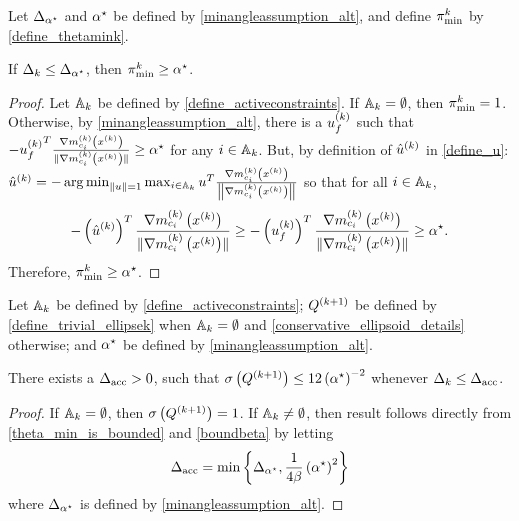 \begin{lemma}
\label{theta_min_is_bounded}
Let ${\Delta_{\alpha^{\star}}}$ and ${ \alpha^{\star} }$ be defined by \cref{minangleassumption_alt}, and
define ${\pi^k_{\textrm{min}}}$ by \cref{define_thetamink}.



If $\Delta_k \le {\Delta_{\alpha^{\star}}}$, then ${\pi^k_{\textrm{min}}} \ge { \alpha^{\star} }$.
\end{lemma}

\begin{proof}
Let ${\mathbb A_{k}}$ be defined by \cref{define_activeconstraints}.
If ${\mathbb A_{k}} = \emptyset$, then ${\pi^k_{\textrm{min}}} = 1$.
Otherwise, by \cref{minangleassumption_alt}, there is a ${u^{(k)}_f}$ such that 
$-{u^{(k)}_f}^T\frac{{\nabla m_{c_i}^{(k)}\left(x^{(k)}\right)}}{\|{\nabla m_{c_i}^{(k)}\left(x^{(k)}\right)}\|} \ge { \alpha^{\star} }$ for any $i \in {\mathbb A_{k}}$.
But, by definition of ${{\hat u}^{(k)}}$ in \cref{define_u}:
${{\hat u}^{(k)}} = -\operatorname*{arg\,min}_{\|u\| = 1} \max_{i \in {\mathbb A_{k}}} u^T\frac{{\nabla m_{c_i}^{(k)}\left(x^{(k)}\right)}}{\left\|{\nabla m_{c_i}^{(k)}\left(x^{(k)}\right)}\right\|}$
so that for all $i \in {\mathbb A_{k}}$,
\begin{align*}
-\left({{\hat u}^{(k)}}\right)^T\frac{{\nabla m_{c_i}^{(k)}\left(x^{(k)}\right)}}{\|{\nabla m_{c_i}^{(k)}\left(x^{(k)}\right)}\|}  \ge -\left({u^{(k)}_f}\right)^T\frac{{\nabla m_{c_i}^{(k)}\left(x^{(k)}\right)}}{\|{\nabla m_{c_i}^{(k)}\left(x^{(k)}\right)}\|} \ge { \alpha^{\star} }.
\end{align*}
Therefore, ${\pi^k_{\textrm{min}}} \ge { \alpha^{\star} }$.
\end{proof}

\begin{lemma}
\label{bounded_condition_numbers}
Let ${\mathbb A_{k}}$ be defined by \cref{define_activeconstraints};
${Q^{(k+1)}}$ be defined by \cref{define_trivial_ellipsek} when ${\mathbb A_{k}} = \emptyset$ and \cref{conservative_ellipsoid_details} otherwise;
and ${ \alpha^{\star} }$ be defined by \cref{minangleassumption_alt}.



There exists a ${\Delta_{\textrm{acc}}} > 0$, such that ${\sigma}\left({Q^{(k+1)}}\right) \le {12}\left({ \alpha^{\star} }\right)^{-2}$ whenever $\Delta_k \le {\Delta_{\textrm{acc}}}$.
\end{lemma}
\begin{proof}
If ${\mathbb A_{k}} = \emptyset$, then 
${\sigma} \left({Q^{(k+1)}}\right) = 1$.
If ${\mathbb A_{k}} \ne \emptyset$, then result follows directly from \cref{theta_min_is_bounded} and \cref{boundbeta} by letting
\begin{align}
{\Delta_{\textrm{acc}}} = \min\left\{{\Delta_{\alpha^{\star}}}, \frac 1 {4 \beta} \left({ \alpha^{\star} } \right)^2 \right\} \label{define_delta_accuracy}
\end{align}
where ${\Delta_{\alpha^{\star}}}$ is defined by \cref{minangleassumption_alt}.
\end{proof}



